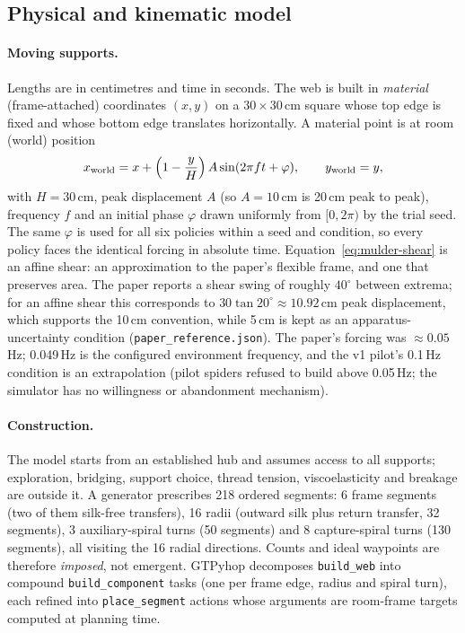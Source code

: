 \subsection{Physical and kinematic model}
\label{sec:mulder-model}

\paragraph{Moving supports.} Lengths are in centimetres and time in seconds. The web is built in
\emph{material} (frame-attached) coordinates $(x,y)$ on a $30\times30$\,cm square whose top edge is fixed
and whose bottom edge translates horizontally. A material point is at room (world) position
\begin{equation}
  x_{\text{world}} = x + \Bigl(1-\frac{y}{H}\Bigr)\,A\sin(2\pi f t+\varphi), \qquad y_{\text{world}} = y,
  \label{eq:mulder-shear}
\end{equation}
with $H=30$\,cm, peak displacement $A$ (so $A=10$\,cm is 20\,cm peak to peak), frequency $f$ and an initial
phase $\varphi$ drawn uniformly from $[0,2\pi)$ by the trial seed. The same $\varphi$ is used for all six
policies within a seed and condition, so every policy faces the identical forcing in absolute time.
Equation~\eqref{eq:mulder-shear} is an affine shear: an approximation to the paper's flexible frame, and one
that preserves area. The paper reports a shear swing of roughly $40^\circ$ between extrema; for an affine
shear this corresponds to $30\tan 20^\circ \approx 10.92$\,cm peak displacement, which supports the 10\,cm
convention, while 5\,cm is kept as an apparatus-uncertainty condition (\texttt{paper\_\allowbreak{}reference.json}).
The paper's forcing was $\approx 0.05$\,Hz; 0.049\,Hz is the configured environment frequency, and the v1
pilot's 0.1\,Hz condition is an extrapolation (pilot spiders refused to build above 0.05\,Hz; the simulator
has no willingness or abandonment mechanism).

\paragraph{Construction.} The model starts from an established hub and assumes access to all supports;
exploration, bridging, support choice, thread tension, viscoelasticity and breakage are outside it.
A generator prescribes 218 ordered segments: 6 frame segments (two of them silk-free transfers), 16
radii (outward silk plus return transfer, 32 segments), 3 auxiliary-spiral turns (50 segments) and 8
capture-spiral turns (130 segments), all visiting the 16 radial directions. Counts and ideal waypoints
are therefore \emph{imposed}, not emergent. GTPyhop decomposes \texttt{build\_\allowbreak{}web} into compound
\texttt{build\_\allowbreak{}component} tasks (one per frame edge, radius and spiral turn), each refined into
\texttt{place\_\allowbreak{}segment} actions whose arguments are room-frame targets computed at planning time.

